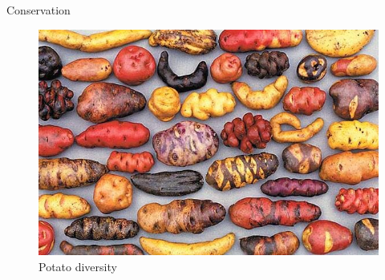 \documentclass[
  ignorenonframetext,
  aspectratio=169]{beamer}
\begin{document}
\begin{frame}{Conservation}
\protect\hypertarget{conservation}{}
\begin{figure}
\includegraphics[width=0.7\linewidth]{./../images/potato_diversity_D7N0aiUXYAIXcLq} \caption{Potato diversity}\label{fig:potato-germplasm-conservation}
\end{figure}
\end{frame}
\end{document}
